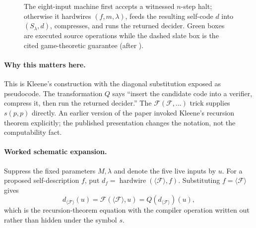 \begin{figure}[t]
\centering

\caption{The eight-input machine first accepts a witnessed \(n\)-step halt; otherwise it hardwires \((f,m,\lambda)\), feeds the resulting self-code \(d\) into \((S_\lambda,d)\), compresses, and runs the returned decider.  Green boxes are executed source operations while the dashed slate box is the cited game-theoretic guarantee (after ).}
\label{fig:halt-f-construction}
\end{figure}

\paragraph{Why this matters here.}
This is Kleene's construction with the diagonal substitution exposed as
pseudocode.  The transformation \(Q\) says ``insert the candidate code into a
verifier, compress it, then run the returned decider.''  The
\(\mathcal F(\mathcal F,\ldots)\) trick supplies \(s(p,p)\) directly.  An
earlier version of the paper invoked Kleene's recursion theorem explicitly;
the published presentation changes the notation, not the computability fact.

\paragraph{Worked schematic expansion.}
Suppress the fixed parameters \(M,\lambda\) and denote the five live inputs by
\(u\).  For a proposed self-description \(f\), put
\(d_f=\operatorname{hardwire}(\langle\mathcal F\rangle,f)\).
Substituting \(f=\langle\mathcal F\rangle\) gives
\[
 d_{\langle\mathcal F\rangle}(u)
 =\mathcal F(\langle\mathcal F\rangle,u)
 =Q(d_{\langle\mathcal F\rangle})(u),
\]
which is the recursion-theorem equation with the compiler operation written
out rather than hidden under the symbol \(s\).
